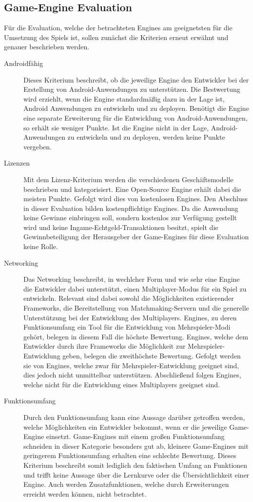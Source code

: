 \subsection{Game-Engine Evaluation}\label{ssec:engineeval}
	Für die Evaluation, welche der betrachteten Engines am geeignetsten für die Umsetzung des Spiels ist, sollen zunächst die Kriterien erneut erwähnt und genauer beschrieben werden.
	\begin{description}
		\item[Androidfähig]{Dieses Kriterium beschreibt, ob die jeweilige Engine den Entwickler bei der Erstellung von Android-Anwendungen zu unterstützen. Die Bestwertung wird erziehlt, wenn die Engine standardmäßig dazu in der Lage ist, Android Anwendungen zu entwickeln und zu deployen. Benötigt die Engine eine separate Erweiterung für die Entwicklung von Android-Anwendungen, so erhält sie weniger Punkte. Ist die Engine nicht in der Lage, Android-Anwendungen zu entwickeln und zu deployen, werden keine Punkte vergeben.}
		\item[Lizenzen]{Mit dem Lizenz-Kriterium werden die verschiedenen Geschäftsmodelle beschrieben und kategorisiert. Eine Open-Source Engine erhält dabei die meisten Punkte. Gefolgt wird dies von kostenlosen Engines. Den Abschluss in dieser Evaluation bilden kostenpflichtige Engines. Da die Anwendung keine Gewinne einbringen soll, sondern kostenlos zur Verfügung gestellt wird und keine Ingame-Echtgeld-Transaktionen besitzt, spielt die Gewinnbeteiligung der Herausgeber der Game-Engines für diese Evaluation keine Rolle.}
		\item[Networking]{Das Networking beschreibt, in wechlcher Form und wie sehr eine Engine die Entwickler dabei unterstützt, einen Multiplayer-Modus für ein Spiel zu entwickeln. Relevant sind dabei sowohl die Möglichkeiten existierender Frameworks, die Bereitstellung von Matchmaking-Servern und die generelle Unterstützung bei der Entwicklung des Multiplayers. Engines, zu deren Funktionsumfang ein Tool für die Entwicklung von Mehrspieler-Modi gehört, belegen in diesem Fall die höchste Bewertung. Engines, welche dem Entwickler durch ihre Frameworks die Möglichkeit zur Mehrspieler-Entwicklung geben, belegen die zweithöchste Bewertung. Gefolgt werden sie von Engines, welche zwar für Mehrspieler-Entwicklung geeignet sind, dies jedoch nicht unmittelbar unterstützen. Abschließend folgen Engines, welche nicht für die Entwicklung eines Multiplayers geeignet sind.}
		\item[Funktionsumfang]{Durch den Funktionsumfang kann eine Aussage darüber getroffen werden, welche Möglichkeiten ein Entwickler bekommt, wenn er die jeweilige Game-Engine einsetzt. Game-Engines mit einem großen Funktionsumfang schneiden in dieser Kategorie besonders gut ab, kleinere Game-Engines mit geringerem Funktionsumfang erhalten eine schlechte Bewertung. Dieses Kriterium beschreibt somit lediglich den faktischen Umfang an Funktionen und trifft keine Aussage über die Lernkurve oder die Übersichtlichkeit einer Engine. Auch werden Zusatzfunktionen, welche durch Erweiterungen erreicht werden können, nicht betrachtet.}

\end{description}
